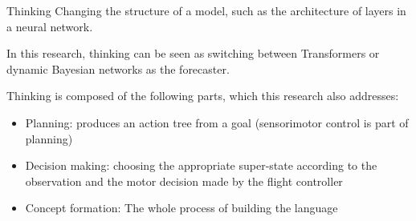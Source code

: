 \begin{frame}[allowframebreaks]{Thinking}
    Changing the structure of a model, such as the architecture of layers in a neural network.
    
    In this research, thinking can be seen as switching between Transformers or dynamic Bayesian networks as the forecaster.
    
    Thinking is composed of the following parts, which this research also addresses:
    \begin{itemize}
        \item Planning: produces an action tree from a goal (sensorimotor control is part of planning)
        \item Decision making: choosing the appropriate super-state according to the observation and the motor decision made by the flight controller
        \item Concept formation: The whole process of building the language
    \end{itemize}

\end{frame}